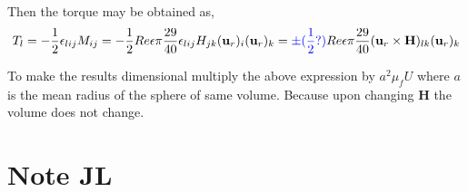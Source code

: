 \documentclass[12pt]{My_preprint}
\begin{document}
Then the torque may be obtained as, 
\begin{equation}
    T_l = - \frac{1}{2}\epsilon_{lij}M_{ij}
    =- \frac{1}{2} Re \epsilon \pi 
    \frac{29}{40} \epsilon_{lij}H_{jk}(\textbf{u}_r)_i  (\textbf{u}_r)_k
    =\color{blue}\pm(\frac{1}{2} ?)\color{black} Re \epsilon \pi 
    \frac{29}{40} (\textbf{u}_r\times \textbf{H})_{lk}  (\textbf{u}_r)_k
\end{equation}

To make the results dimensional multiply the above expression by $a^2 \mu_f U$ where $a$ is the mean radius of the sphere of same volume. Because upon changing $\textbf{H}$ the volume does not change. 


\section{Note JL}
\end{document}
